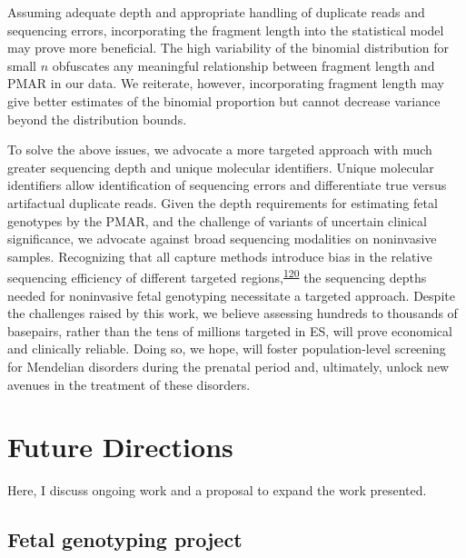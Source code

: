\documentclass[11pt,letterpaper,oneside]{book}
\begin{document}
Assuming adequate depth and appropriate handling of duplicate reads and sequencing errors, incorporating the fragment length into the statistical model may prove more beneficial.
The high variability of the binomial distribution for small \(n\) obfuscates any meaningful relationship between fragment length and PMAR in our data.
We reiterate, however, incorporating fragment length may give better estimates of the binomial proportion but cannot decrease variance beyond the distribution bounds.

To solve the above issues, we advocate a more targeted approach with much greater sequencing depth and unique molecular identifiers.
Unique molecular identifiers allow identification of sequencing errors and differentiate true versus artifactual duplicate reads.
Given the depth requirements for estimating fetal genotypes by the PMAR, and the challenge of variants of uncertain clinical significance, we advocate against broad sequencing modalities on noninvasive samples.
Recognizing that all capture methods introduce bias in the relative sequencing efficiency of different targeted regions,\textsuperscript{\protect\hyperlink{ref-seaby:2016aa}{120}} the sequencing depths needed for noninvasive fetal genotyping necessitate a targeted approach.
Despite the challenges raised by this work, we believe assessing hundreds to thousands of basepairs, rather than the tens of millions targeted in ES, will prove economical and clinically reliable.
Doing so, we hope, will foster population-level screening for Mendelian disorders during the prenatal period and, ultimately, unlock new avenues in the treatment of these disorders.

\hypertarget{future-directions}{%
\chapter{Future Directions}\label{future-directions}}

Here, I discuss ongoing work and a proposal to expand the work presented.

\hypertarget{fetal-genotyping-project}{%
\section{Fetal genotyping project}\label{fetal-genotyping-project}}
\end{document}
